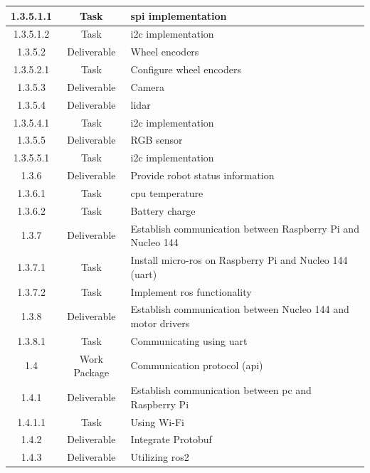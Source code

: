 \begin{longtable}{|c|c|m{}|}
    \rowcolor{c1-t} 1.3.5.1.1 & Task & \acs{spi} implementation \\ \hline
    \rowcolor{c1-t} 1.3.5.1.2 & Task & \acs{i2c} implementation \\ \hline
    \rowcolor{c1-d} 1.3.5.2 & Deliverable & Wheel encoders \\ \hline
    \rowcolor{c1-t} 1.3.5.2.1 & Task & Configure wheel encoders \\ \hline
    \rowcolor{c1-d} 1.3.5.3 & Deliverable & Camera \\ \hline
    \rowcolor{c1-d} 1.3.5.4 & Deliverable & \acs{lidar} \\ \hline
    \rowcolor{c1-t} 1.3.5.4.1 & Task & \acs{i2c} implementation \\ \hline
    \rowcolor{c1-d} 1.3.5.5 & Deliverable & RGB sensor \\ \hline
    \rowcolor{c1-t} 1.3.5.5.1 & Task & \acs{i2c} implementation \\ \hline
    \rowcolor{c1-d} 1.3.6 & Deliverable & Provide robot status information \\ \hline
    \rowcolor{c1-t} 1.3.6.1 & Task & \acs{cpu} temperature \\ \hline
    \rowcolor{c1-t} 1.3.6.2 & Task & Battery charge \\ \hline
    \rowcolor{c1-d} 1.3.7 & Deliverable & Establish communication between Raspberry Pi and Nucleo 144 \\ \hline
    \rowcolor{c1-t} 1.3.7.1 & Task & Install micro-\acs{ros} on Raspberry Pi and Nucleo 144 (\acs{uart}) \\ \hline
    \rowcolor{c1-t} 1.3.7.2 & Task & Implement \acs{ros} functionality \\ \hline
    \rowcolor{c1-d} 1.3.8 & Deliverable & Establish communication between Nucleo 144 and motor drivers \\ \hline
    \rowcolor{c1-t} 1.3.8.1 & Task & Communicating using \acs{uart} \\ \hline
    \rowcolor{c1-wp} 1.4 & Work Package & Communication protocol (\acs{api}) \\ \hline
    \rowcolor{c1-d} 1.4.1 & Deliverable & Establish communication between \acs{pc} and Raspberry Pi \\ \hline
    \rowcolor{c1-t} 1.4.1.1 & Task & Using Wi-Fi \\ \hline
    \rowcolor{c1-d} 1.4.2 & Deliverable & Integrate Protobuf \\ \hline
    \rowcolor{c1-d} 1.4.3 & Deliverable & Utilizing \acs{ros2} \\ \hline

\end{longtable}

